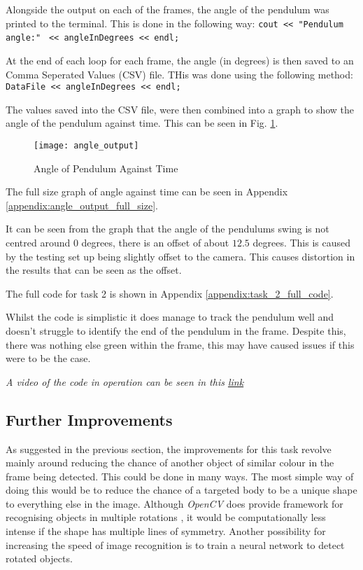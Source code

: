 \documentclass[conference]{IEEEtran}
\begin{document}
Alongside the output on each of the frames, the angle of the pendulum was printed to the terminal. This is done in the following way: \verb|cout << "Pendulum angle:"|
\verb| << angleInDegrees << endl;|

At the end of each loop for each frame, the angle (in degrees) is then saved to an Comma Seperated Values (CSV) file. THis was done using the following method: \verb|DataFile << angleInDegrees << endl;|

The values saved into the CSV file, were then combined into a graph to show the angle of the pendulum against time. This can be seen in Fig. \ref{fig:angle_output}.

\begin{figure}
\centerline{\texttt{[image: angle\_output]}}
\caption{Angle of Pendulum Against Time}
\label{fig:angle_output}
\end{figure}

The full size graph of angle against time can be seen in Appendix \ref{appendix:angle_output_full_size}.

It can be seen from the graph that the angle of the pendulums swing is not centred around $0$ degrees, there is an offset of about $12.5$ degrees. This is caused by the testing set up being slightly offset to the camera. This causes distortion in the results that can be seen as the offset. 

The full code for task 2 is shown in Appendix \ref{appendix:task_2_full_code}.

Whilst the code is simplistic it does manage to track the pendulum well and doesn't struggle to identify the end of the pendulum in the frame. Despite this, there was nothing else green within the frame, this may have caused issues if this were to be the case. 

\textit{A video of the code in operation can be seen in this \href{https://youtu.be/SP6NCaCyRWU}{link}}

\subsection{Further Improvements}

As suggested in the previous section, the improvements for this task revolve mainly around reducing the chance of another object of similar colour in the frame being detected. This could be done in many ways. The most simple way of doing this would be to reduce the chance of a targeted body to be a unique shape to everything else in the image. Although \textit{OpenCV} does provide framework for recognising objects in multiple rotations \cite{ref:object_orientation}, it would be computationally less intense if the shape has multiple lines of symmetry. Another possibility for increasing the speed of image recognition is to train a neural network to detect rotated objects. \cite{9578190} 
\end{document}
